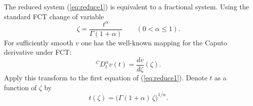 \documentclass{article}
\begin{document}
\begin{description}
The reduced system (\ref{eq:reduce1}) is equivalent to a fractional system. Using the standard FCT change of variable
\begin{equation*}
\zeta=\frac{t^\alpha}{\Gamma(1+\alpha)} \qquad(0<\alpha\le1).
\end{equation*}
For sufficiently smooth $v$ one has the well-known mapping for the Caputo derivative under FCT:
\begin{equation*}
{}^{C}D_t^\alpha v(t)=\frac{d v}{d\zeta}(\zeta).
\end{equation*}
Apply this transform to the first equation of (\ref{eq:reduce1}). Denote $t$ as a function of $\zeta$ by
\begin{equation*}
t(\zeta)=\big(\Gamma(1+\alpha)\,\zeta\big)^{1/\alpha}.
\end{equation*}


\end{description}
\end{document}
